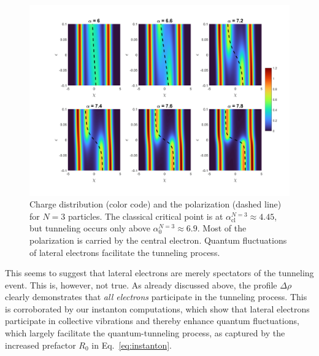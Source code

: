 \documentclass[aps, prb, floatfix, twocolumn, notitlepage, superscriptaddress, 10pt]{revtex4-2}
\newcommand{\1}{{1\hspace*{-0.5ex} \textrm{l} \hspace*{0.5ex}}}
\begin{document}
\begin{figure}[t!]
    \begin{center}
     \includegraphics[width=1.6\columnwidth]{SupMatFig_DensitySeries}
     \caption{
      \label{fig:charge_distribution}
     Charge distribution (color code) and the polarization (dashed line)  for $N = 3$ particles. The classical critical point is at $\alpha_\text{cl}^{N=3} \approx 4.45$, but tunneling occurs only above $\alpha^{N=3}_0 \approx 6.9$. Most of the polarization is carried by the central electron. Quantum fluctuations of lateral electrons facilitate the tunneling process.}
  \end{center}
     \end{figure}

This seems to suggest that lateral electrons are merely spectators of the tunneling event. 
This is, however, not true. As already discussed above, the profile $\Delta \rho$ clearly demonstrates that 
\emph{all electrons} participate in the tunneling process. This is corroborated 
by our instanton computations, which show that lateral electrons participate in 
collective vibrations and thereby  enhance quantum fluctuations,  
which largely facilitate the quantum-tunneling process, as captured by the 
increased prefactor $R_0$ in Eq.~\eqref{eq:instanton}.

		
\end{document}

